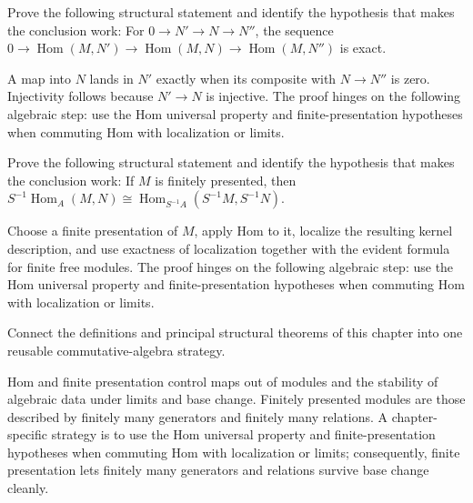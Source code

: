 \begin{problem}\label{prob:v12-problem-10}
Prove the following structural statement and identify the hypothesis that makes the conclusion work: For $0\to N'\to N\to N''$, the sequence $0\to\operatorname{Hom}(M,N')\to\operatorname{Hom}(M,N)\to\operatorname{Hom}(M,N'')$ is exact.
\end{problem}
\begin{solution}
A map into $N$ lands in $N'$ exactly when its composite with $N\to N''$ is zero. Injectivity follows because $N'\to N$ is injective. The proof hinges on the following algebraic step: use the Hom universal property and finite-presentation hypotheses when commuting Hom with localization or limits.
\end{solution}

\begin{problem}\label{prob:v12-problem-11}
Prove the following structural statement and identify the hypothesis that makes the conclusion work: If $M$ is finitely presented, then $S^{-1}\operatorname{Hom}_A(M,N)\cong\operatorname{Hom}_{S^{-1}A}(S^{-1}M,S^{-1}N)$.
\end{problem}
\begin{solution}
Choose a finite presentation of $M$, apply Hom to it, localize the resulting kernel description, and use exactness of localization together with the evident formula for finite free modules. The proof hinges on the following algebraic step: use the Hom universal property and finite-presentation hypotheses when commuting Hom with localization or limits.
\end{solution}

\begin{problem}\label{prob:v12-problem-12}
Connect the definitions and principal structural theorems of this chapter into one reusable commutative-algebra strategy.
\end{problem}
\begin{solution}
Hom and finite presentation control maps out of modules and the stability of algebraic data under limits and base change. Finitely presented modules are those described by finitely many generators and finitely many relations. A chapter-specific strategy is to use the Hom universal property and finite-presentation hypotheses when commuting Hom with localization or limits; consequently, finite presentation lets finitely many generators and relations survive base change cleanly.
\end{solution}

